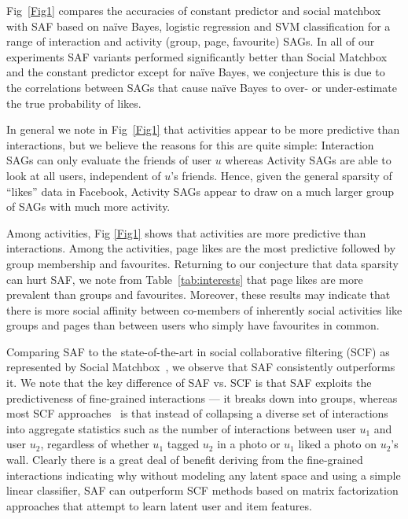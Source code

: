 Fig~\ref{Fig1} compares the accuracies of constant predictor and
social matchbox with SAF based on na\"{i}ve Bayes, logistic regression
and SVM classification for a range of interaction and activity (group,
page, favourite) SAGs.  In all of our experiments SAF variants
performed significantly better than Social Matchbox and the constant
predictor except for na\"{i}ve Bayes, we conjecture this is due to the
correlations between SAGs that cause na\"{i}ve Bayes to over- or
under-estimate the true probability of likes.

In general we note in Fig~\ref{Fig1} that activities appear to be
more predictive than interactions, but we believe the reasons for this
are quite simple: Interaction SAGs can only evaluate the friends of
user $u$ whereas Activity SAGs are able to look at all users,
independent of $u$'s friends.
Hence, given the general sparsity of ``likes'' data in Facebook, 
Activity SAGs appear to draw on a much larger group of SAGs
with much more activity.

Among activities, Fig \ref{Fig1} shows that activities are more
predictive than interactions. Among the activities, page likes are the
most predictive followed by group membership and favourites.
Returning to our conjecture that data sparsity can hurt SAF, we note
from Table~\ref{tab:interests} that page likes are more prevalent than
groups and favourites.  Moreover, these results may indicate that
there is more social affinity between co-members of inherently social
activities like groups and pages than between users who simply have
favourites in common.

Comparing SAF to the state-of-the-art in social
collaborative filtering (SCF) as represented by Social
Matchbox~\cite{Noel2012NOF}, we observe that SAF consistently
outperforms it.  We note that the key difference of SAF vs. SCF is
that SAF exploits the predictiveness of fine-grained interactions ---
it breaks down into groups, whereas most SCF
approaches~\cite{Noel2012NOF,lla,socinf,sr,rrmf,sorec,ste} is that
instead of collapsing a diverse set of interactions into aggregate
statistics such as the number of interactions between user $u_1$ and
user $u_2$, regardless of whether $u_1$ tagged $u_2$ in a photo or
$u_1$ liked a photo on $u_2$'s wall.  Clearly there is a great deal of
benefit deriving from the fine-grained interactions indicating why
without modeling any latent space and using a simple linear
classifier, SAF can outperform SCF methods based on matrix
factorization approaches that attempt to learn latent user and item
features.

